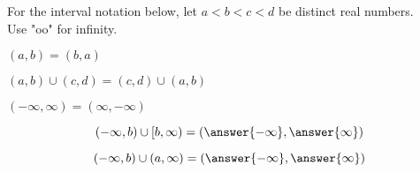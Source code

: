 \documentclass{ximera}
\author{Lee Wayand}
\begin{document}
For the interval notation below, let $a < b < c < d$ be distinct real numbers. \\

Use "oo" for infinity. \\


\begin{exercise}

$(a, b) = (b, a)$

\begin{multipleChoice}
\end{multipleChoice}

\end{exercise}




\begin{exercise}

$(a, b) \cup (c, d) = (c, d) \cup (a, b)$

\begin{multipleChoice}
\end{multipleChoice}

\end{exercise}





\begin{exercise}

$(-\infty, \infty) = (\infty, -\infty)$

\begin{multipleChoice}
\end{multipleChoice}

\end{exercise}






\begin{exercise}
\[
(-\infty, b) \cup [b, \infty) = \left( \answer{-\infty}, \answer{\infty} \right)
\]
\end{exercise}







\begin{exercise}
\[
(-\infty, b) \cup (a, \infty) = \left( \answer{-\infty}, \answer{\infty} \right)
\]
\end{exercise}
\end{document}
